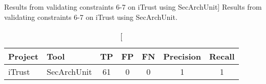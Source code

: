 \begin{table}[h]
\captionsetup{justification=centering}
\caption
    [Results from validating constraints 6-7 on iTrust using SecArchUnit]
    {Results from validating constraints 6-7 on iTrust using SecArchUnit.}
\begin{center}
\begin{tabular}{llccccc}
\textbf{Project} & \textbf{Tool}    & \textbf{TP} & \textbf{FP} & \textbf{FN} & \textbf{Precision} & \textbf{Recall} \\
\hline
iTrust  & SecArchUnit & 61 & 0  & 0  & 1         & 1    \\
\hline
\end{tabular}
\end{center}
\label{tab:tool_extension}
\end{table}